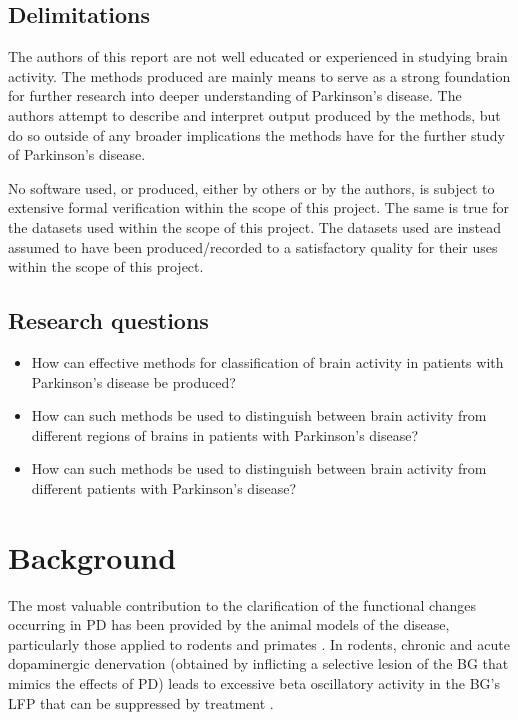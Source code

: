 \documentclass{article}
\begin{document}
\subsection{Delimitations}

The authors of this report are not well educated or experienced in studying brain activity.
The methods produced are mainly means to serve as a strong foundation for further research into deeper understanding of Parkinson's disease.
The authors attempt to describe and interpret output produced by the methods, but do so outside of any broader implications the methods have for the further study of Parkinson's disease.

No software used, or produced, either by others or by the authors, is subject to extensive formal verification within the scope of this project. 
The same is true for the datasets used within the scope of this project.
The datasets used are instead assumed to have been produced/recorded to a satisfactory quality for their uses within the scope of this project.

\subsection{Research questions}

\begin{itemize}
    \item How can effective methods for classification of brain activity in patients with Parkinson's disease be produced?
    \item How can such methods be used to distinguish between brain activity from different regions of brains in patients with Parkinson's disease?
    \item How can such methods be used to distinguish between brain activity from different patients with Parkinson's disease?
\end{itemize}

\newpage
\section{Background}

The most valuable contribution to the clarification of the functional changes occurring in PD has been provided by the animal models of the disease, particularly those applied to rodents and primates \citep{Mallet}. 
In rodents, chronic and acute dopaminergic denervation (obtained by inflicting a selective lesion of the BG that mimics the effects of PD) leads to excessive beta oscillatory activity in the BG's LFP that can be suppressed by treatment \citep{Mallet}.
\end{document}
